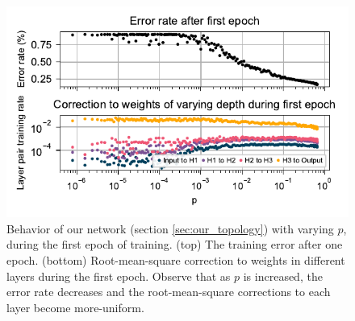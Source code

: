 \documentclass[utf8]{frontiersSCNS}
\begin{document}
\begin{figure}[h!]
\begin{center}
\includegraphics[width=\textwidth]{figures/MNIST_one_epoch_performance.pdf}
\end{center}
\caption{Behavior of our network (section \ref{sec:our_topology}) with varying $p$, during the first epoch of training. (top) The training error after one epoch. (bottom) Root-mean-square correction to weights in different layers during the first epoch. Observe that as $p$ is increased, the error rate decreases and the root-mean-square corrections to each layer become more-uniform.} \label{fig:mnist_1epoch}
\end{figure}
\end{document}
